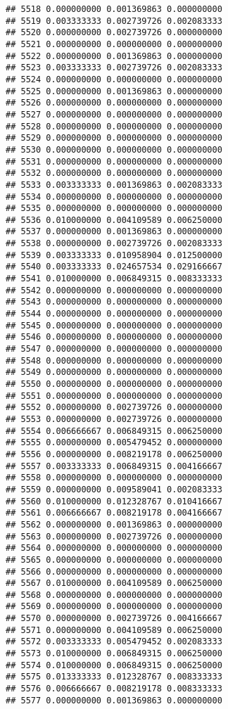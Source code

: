 \documentclass[
]{article}
\begin{document}
\begin{verbatim}
## 5518 0.000000000 0.001369863 0.000000000
## 5519 0.003333333 0.002739726 0.002083333
## 5520 0.000000000 0.002739726 0.000000000
## 5521 0.000000000 0.000000000 0.000000000
## 5522 0.000000000 0.001369863 0.000000000
## 5523 0.003333333 0.002739726 0.002083333
## 5524 0.000000000 0.000000000 0.000000000
## 5525 0.000000000 0.001369863 0.000000000
## 5526 0.000000000 0.000000000 0.000000000
## 5527 0.000000000 0.000000000 0.000000000
## 5528 0.000000000 0.000000000 0.000000000
## 5529 0.000000000 0.000000000 0.000000000
## 5530 0.000000000 0.000000000 0.000000000
## 5531 0.000000000 0.000000000 0.000000000
## 5532 0.000000000 0.000000000 0.000000000
## 5533 0.003333333 0.001369863 0.002083333
## 5534 0.000000000 0.000000000 0.000000000
## 5535 0.000000000 0.000000000 0.000000000
## 5536 0.010000000 0.004109589 0.006250000
## 5537 0.000000000 0.001369863 0.000000000
## 5538 0.000000000 0.002739726 0.002083333
## 5539 0.003333333 0.010958904 0.012500000
## 5540 0.003333333 0.024657534 0.029166667
## 5541 0.010000000 0.006849315 0.008333333
## 5542 0.000000000 0.000000000 0.000000000
## 5543 0.000000000 0.000000000 0.000000000
## 5544 0.000000000 0.000000000 0.000000000
## 5545 0.000000000 0.000000000 0.000000000
## 5546 0.000000000 0.000000000 0.000000000
## 5547 0.000000000 0.000000000 0.000000000
## 5548 0.000000000 0.000000000 0.000000000
## 5549 0.000000000 0.000000000 0.000000000
## 5550 0.000000000 0.000000000 0.000000000
## 5551 0.000000000 0.000000000 0.000000000
## 5552 0.000000000 0.002739726 0.000000000
## 5553 0.000000000 0.002739726 0.000000000
## 5554 0.006666667 0.006849315 0.006250000
## 5555 0.000000000 0.005479452 0.000000000
## 5556 0.000000000 0.008219178 0.006250000
## 5557 0.003333333 0.006849315 0.004166667
## 5558 0.000000000 0.000000000 0.000000000
## 5559 0.000000000 0.009589041 0.002083333
## 5560 0.010000000 0.012328767 0.010416667
## 5561 0.006666667 0.008219178 0.004166667
## 5562 0.000000000 0.001369863 0.000000000
## 5563 0.000000000 0.002739726 0.000000000
## 5564 0.000000000 0.000000000 0.000000000
## 5565 0.000000000 0.000000000 0.000000000
## 5566 0.000000000 0.000000000 0.000000000
## 5567 0.010000000 0.004109589 0.006250000
## 5568 0.000000000 0.000000000 0.000000000
## 5569 0.000000000 0.000000000 0.000000000
## 5570 0.000000000 0.002739726 0.004166667
## 5571 0.000000000 0.004109589 0.006250000
## 5572 0.003333333 0.005479452 0.002083333
## 5573 0.010000000 0.006849315 0.006250000
## 5574 0.010000000 0.006849315 0.006250000
## 5575 0.013333333 0.012328767 0.008333333
## 5576 0.006666667 0.008219178 0.008333333
## 5577 0.000000000 0.001369863 0.000000000

\end{verbatim}
\end{document}
